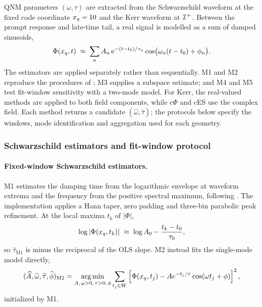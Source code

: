 QNM parameters $(\omega,\tau)$ are extracted from the Schwarzschild
waveform at the fixed code coordinate $x_{q}=10$ and the Kerr waveform
at $\mathcal{I}^{+}$. Between the
prompt response and late-time tail, a real signal is modelled as a
sum of damped sinusoids,
\begin{equation}
  \Phi(x_{q}, t) \;\approx\;
  \sum_{n} A_n\,\mathrm{e}^{-(t-t_0)/\tau_n}
  \cos\bigl(\omega_n(t-t_0) + \phi_n\bigr).
  \label{eq:qnm-template}
\end{equation}
The estimators are applied separately rather than sequentially. M1
and M2 reproduce the procedures of \citet{Patel2024pinn}; M3 supplies
a subspace estimate; and M4 and M5 test fit-window sensitivity with a
two-mode model. For Kerr, the real-valued methods are applied to both
field components, while c$\Phi$ and cES use the complex field. Each
method returns a candidate $(\widehat\omega,\widehat\tau)$; the
protocols below specify the windows, mode identification and
aggregation used for each geometry.

\subsubsection{Schwarzschild estimators and fit-window protocol}
\label{sec:plateau}

\paragraph{Fixed-window Schwarzschild estimators.} M1 estimates the
damping time from the logarithmic envelope at waveform extrema and
the frequency from the positive spectral maximum, following
\citet{Patel2024pinn}. The implementation applies a Hann taper, zero
padding and three-bin parabolic peak refinement. At the local maxima
$t_k$ of $|\Phi|$,
\begin{equation}
  \log|\Phi(x_{q}, t_k)| \;\approx\;
  \log A_{0} - \frac{t_k - t_0}{\tau_{0}},
  \label{eq:logline}
\end{equation}
so $\widehat\tau_{\mathrm{M1}}$ is minus the reciprocal of the OLS
slope. M2 instead fits the single-mode model directly,
\begin{equation}
  (\widehat A,\widehat\omega,\widehat\tau,\widehat\phi)_{\mathrm{M2}}
  =\underset{A,\,\omega>0,\,\tau>0,\,\phi}{\arg\min}
  \sum_{t_j\in W}
  \left[\Phi(x_{q},t_j)-A e^{-t_j/\tau}
  \cos(\omega t_j+\phi)\right]^2,
  \label{eq:m2-fit}
\end{equation}
initialized by M1.

